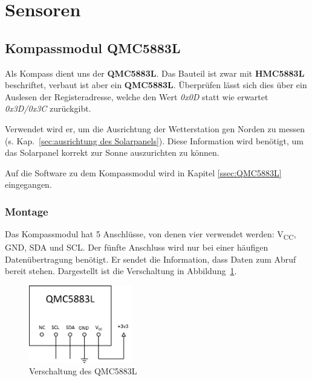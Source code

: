 \section{Sensoren}\label{sec:Sensoren}




\subsection{Kompassmodul QMC5883L}
Als Kompass dient uns der \textbf{QMC5883L}. Das Bauteil ist zwar mit \textbf{HMC5883L} beschriftet, verbaut ist aber ein \textbf{QMC5883L}. Überprüfen lässt sich dies über ein Auslesen der Registeradresse, welche den Wert \textit{0x0D} statt wie erwartet \textit{0x3D/0x3C} zurückgibt.

Verwendet wird er, um die Ausrichtung der Wetterstation gen Norden zu messen (s. Kap.~\ref{sec:ausrichtung des Solarpanels}). Diese Information wird benötigt, um das Solarpanel korrekt zur Sonne auszurichten zu können. 

Auf die Software zu dem Kompassmodul wird in Kapitel \ref{ssec:QMC5883L} eingegangen.

\subsubsection{Montage}
Das Kompassmodul hat 5 Anschlüsse, von denen vier verwendet werden: V\textsubscript{CC}, GND, SDA und SCL. Der fünfte Anschluss wird nur bei einer häufigen Datenübertragung benötigt. Er sendet die Information, dass Daten zum Abruf bereit stehen. Dargestellt ist die Verschaltung in Abbildung~\ref{fig:QMC5883L_Plan}.

\begin{figure}[H]
  \centering
  \includegraphics[width=0.4\textwidth]{./img/QMC5883L_Plan.png}
  \caption{Verschaltung des QMC5883L}\label{fig:QMC5883L_Plan}
\end{figure}

